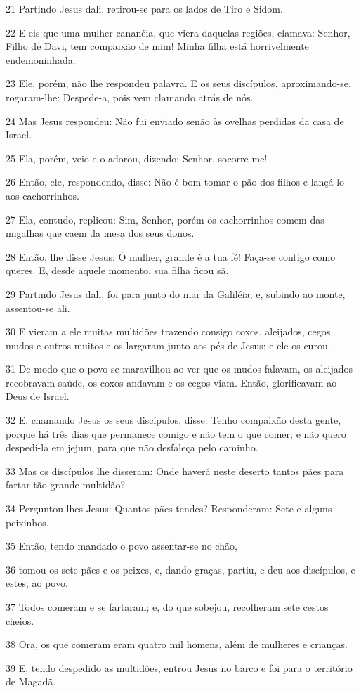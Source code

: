 \par 21 Partindo Jesus dali, retirou-se para os lados de Tiro e Sidom.
\par 22 E eis que uma mulher cananéia, que viera daquelas regiões, clamava: Senhor, Filho de Davi, tem compaixão de mim! Minha filha está horrivelmente endemoninhada.
\par 23 Ele, porém, não lhe respondeu palavra. E os seus discípulos, aproximando-se, rogaram-lhe: Despede-a, pois vem clamando atrás de nós.
\par 24 Mas Jesus respondeu: Não fui enviado senão às ovelhas perdidas da casa de Israel.
\par 25 Ela, porém, veio e o adorou, dizendo: Senhor, socorre-me!
\par 26 Então, ele, respondendo, disse: Não é bom tomar o pão dos filhos e lançá-lo aos cachorrinhos.
\par 27 Ela, contudo, replicou: Sim, Senhor, porém os cachorrinhos comem das migalhas que caem da mesa dos seus donos.
\par 28 Então, lhe disse Jesus: Ó mulher, grande é a tua fé! Faça-se contigo como queres. E, desde aquele momento, sua filha ficou sã.
\par 29 Partindo Jesus dali, foi para junto do mar da Galiléia; e, subindo ao monte, assentou-se ali.
\par 30 E vieram a ele muitas multidões trazendo consigo coxos, aleijados, cegos, mudos e outros muitos e os largaram junto aos pés de Jesus; e ele os curou.
\par 31 De modo que o povo se maravilhou ao ver que os mudos falavam, os aleijados recobravam saúde, os coxos andavam e os cegos viam. Então, glorificavam ao Deus de Israel.
\par 32 E, chamando Jesus os seus discípulos, disse: Tenho compaixão desta gente, porque há três dias que permanece comigo e não tem o que comer; e não quero despedi-la em jejum, para que não desfaleça pelo caminho.
\par 33 Mas os discípulos lhe disseram: Onde haverá neste deserto tantos pães para fartar tão grande multidão?
\par 34 Perguntou-lhes Jesus: Quantos pães tendes? Responderam: Sete e alguns peixinhos.
\par 35 Então, tendo mandado o povo assentar-se no chão,
\par 36 tomou os sete pães e os peixes, e, dando graças, partiu, e deu aos discípulos, e estes, ao povo.
\par 37 Todos comeram e se fartaram; e, do que sobejou, recolheram sete cestos cheios.
\par 38 Ora, os que comeram eram quatro mil homens, além de mulheres e crianças.
\par 39 E, tendo despedido as multidões, entrou Jesus no barco e foi para o território de Magadã.

